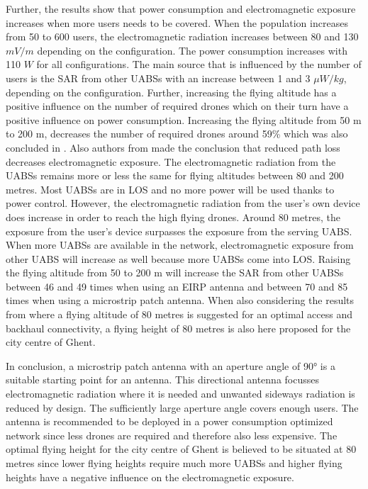 \documentclass[twocolumn]{phdsymp} %
\begin{document}
Further, the results show that power 
consumption and electromagnetic exposure increases when more users needs to be covered.
When the population increases from 50 to 600 users, 
the electromagnetic radiation increases between 80 and 130 $mV/m$ depending
on the configuration. The power consumption increases with 110 $W$ for all configurations. 
The main source that is influenced by the number of users is the \gls{SAR} from other UABSs with an increase between 1 and 3 $\mu W/kg$, depending on 
the configuration.
Further, increasing the flying altitude has a positive influence on the number of required drones which on their 
turn have a positive influence on power consumption. Increasing the flying altitude from 50 m to 200 m, decreases the number 
of required drones around 59\% which was also concluded in \cite{J2}.
Also authors from \cite{J17_kuehn2019modelling} made the conclusion that reduced path loss decreases electromagnetic exposure.
The electromagnetic radiation from the \gls{UABS}s remains more or less the same for flying altitudes between 80 and 200 metres. Most 
\gls{UABS}s are in \gls{LOS} and no more power will be used thanks to power control.
However, the electromagnetic radiation from the user's own device does increase in order to reach the high flying drones.
Around 80 metres, the exposure from the  user's device surpasses the exposure from the serving \gls{UABS}.
When more \gls{UABS}s are available in the network, electromagnetic exposure from other \gls{UABS} will increase as well 
because more \gls{UABS}s come into \gls{LOS}. Raising the flying altitude from 50 to 200 m will increase the \gls{SAR} from other 
\gls{UABS}s between 46 and 49 times when using an \gls{EIRP} antenna and between 70 and 85 times when using a microstrip patch antenna.
When also considering the results from \cite{U1} where a flying altitude of  
80 metres is suggested for an optimal access and backhaul connectivity, a flying height 
of 80 metres is also here proposed for the city centre of Ghent.

In conclusion, a microstrip patch antenna with an aperture angle of \ang{90} is a suitable starting point for an antenna. 
This directional antenna focusses electromagnetic radiation where it is needed and unwanted sideways radiation 
is reduced by design.
The sufficiently large aperture angle covers enough users. The antenna is recommended to be deployed in a power consumption 
optimized network since less drones are required and therefore also less expensive.
The optimal flying height for the city centre of Ghent is believed to be situated at 80 metres since lower flying heights require much more \gls{UABS}s and
higher flying heights have a negative influence on the electromagnetic exposure.  
\end{document}
